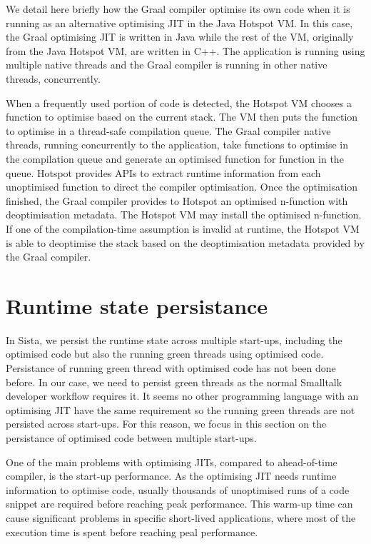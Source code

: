 \documentclass[a4paper,12pt,twoside]{../includes/ThesisStyle}
\begin{document}
We detail here briefly how the Graal compiler optimise its own code when it is running as an alternative optimising JIT in the Java Hotspot VM. In this case, the Graal optimising JIT is written in Java while the rest of the VM, originally from the Java Hotspot VM, are written in C++. The application is running using multiple native threads and the Graal compiler is running in other native threads, concurrently.

When a frequently used portion of code is detected, the Hotspot VM chooses a function to optimise based on the current stack. The VM then puts the function to optimise in a thread-safe compilation queue. The Graal compiler native threads, running concurrently to the application, take functions to optimise in the compilation queue and generate an optimised function for function in the queue. Hotspot provides APIs to extract runtime information from each unoptimised function to direct the compiler optimisation. Once the optimisation finished, the Graal compiler provides to Hotspot an optimised n-function with deoptimisation metadata. The Hotspot VM may install the optimised n-function. If one of the compilation-time assumption is invalid at runtime, the Hotspot VM is able to deoptimise the stack based on the deoptimisation metadata provided by the Graal compiler.


\section{Runtime state persistance}
\label{sec:persistance}

In Sista, we persist the runtime state across multiple start-ups, including the optimised code but also the running green threads using optimised code. Persistance of running green thread with optimised code has not been done before. In our case, we need to persist green threads as the normal Smalltalk developer workflow requires it. It seems no other programming language with an optimising JIT have the same requirement so the running green threads are not persisted across start-ups. For this reason, we focus in this section on the persistance of optimised code between multiple start-ups.

One of the main problems with optimising JITs, compared to ahead-of-time compiler, is the start-up performance. As the optimising JIT needs runtime information to optimise code, usually thousands of unoptimised runs of a code snippet are required before reaching peak performance. This warm-up time can cause significant problems in specific short-lived applications, where most of the execution time is spent before reaching peal performance. 
\end{document}
